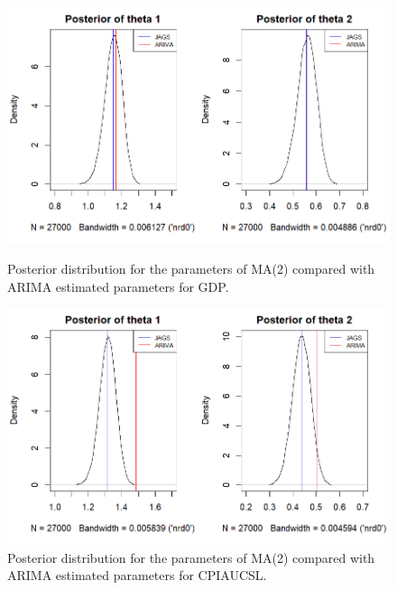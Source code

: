 \begin{figure}[H]
    \centering
    \begin{minipage}{0.49\textwidth}
        \centering
        \includegraphics[width=\textwidth]{images/3-MA/ARIMA_MA2_posterior_distribution_gdp.png}
        \caption{Posterior distribution for the parameters of MA(2) compared with ARIMA estimated parameters for GDP.}
        \label{fig:ARIMA_MA2_gdp_posteriors}
    \end{minipage}\hfill
    \begin{minipage}{0.49\textwidth}
        \centering
        \includegraphics[width=\textwidth]{images/3-MA/ARIMA_MA2_posterior_distribution_infl.png}
        \caption{Posterior distribution for the parameters of MA(2) compared with ARIMA estimated parameters for CPIAUCSL.}
        \label{fig:ARIMA_MA2_infl_posteriors}
    \end{minipage}
\end{figure}
